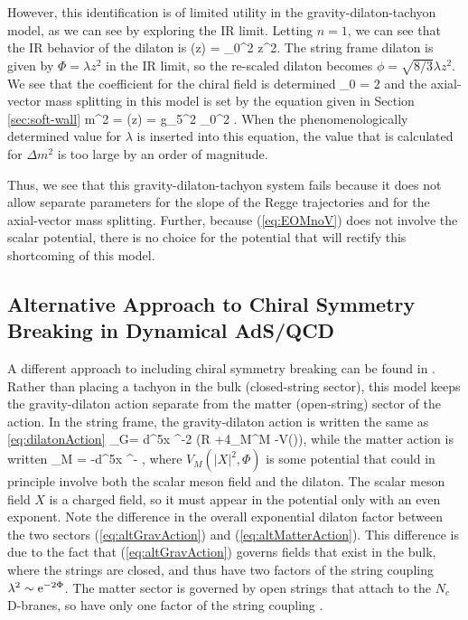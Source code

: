 However, this identification is of limited utility in the gravity-dilaton-tachyon model, as we can see by exploring the IR limit.
Letting $n=1$, we can see that the IR behavior of the dilaton is 
\be
\phi(z) = \chi_0^2 z^2.
\ee
The string frame dilaton is given by $\Phi = \lambda z^2$ in the IR limit, so the re-scaled dilaton becomes $\phi = \sqrt{8/3}\lambda z^2$.
We see that the coefficient for the chiral field is determined
\be
\chi_0 = 2 \sqrt{\lambda}
\ee
and the axial-vector mass splitting in this model is set by the equation given in Section \ref{sec:soft-wall} %
\be
\Delta m^2 = (z\rightarrow \infty) = g_5^2 \chi_0^2 .
\ee
When the phenomenologically determined value for $\lambda$ is inserted into this equation, the value that is calculated for $\Delta m^2$ is too large by an order of magnitude. 

Thus, we see that this gravity-dilaton-tachyon system fails because it does not allow separate parameters for the slope of the Regge trajectories and for the axial-vector mass splitting.
Further, because (\ref{eq:EOMnoV}) does not involve the scalar potential, there is no choice for the potential that will rectify this shortcoming of this model. 

\subsection{Alternative Approach to Chiral Symmetry Breaking in Dynamical AdS/QCD}

A different approach to including chiral symmetry breaking can be found in \cite{Li2013,Li2013a}. 
Rather than placing a tachyon in the bulk (closed-string sector), this model keeps the gravity-dilaton action separate from the matter (open-string) sector of the action.
In the string frame, the gravity-dilaton action is written the same as \ref{eq:dilatonAction}
\be
{}_G=  \int d^5x \root \EXP^{-2\Phi} \left(R +4\partial_M\partial^M -V(\Phi)\right), 
\label{eq:altGravAction}
\ee
while the matter action is written
\be
{}_M  = -\int d^5x \root \EXP^{-\Phi}  ,
\label{eq:altMatterAction}
\ee
where $V_M(|X|^2,\Phi)$ is some potential that could in principle involve both the scalar meson field and the dilaton.
The scalar meson field $X$ is a charged field, so it must  appear in the potential only with an even exponent.
Note the difference in the overall exponential dilaton factor between the two sectors (\ref{eq:altGravAction}) and (\ref{eq:altMatterAction}).
This difference is due to the fact that (\ref{eq:altGravAction}) governs fields that exist in the bulk, where the strings are closed, and thus have two factors of the string coupling $\lambda^2 \sim \mathrm{e}^{-2\Phi}$. 
The matter sector is governed by open strings that attach to the $N_c$ D-branes, so have only one factor of the string coupling \cite{FILL-IN}. 

